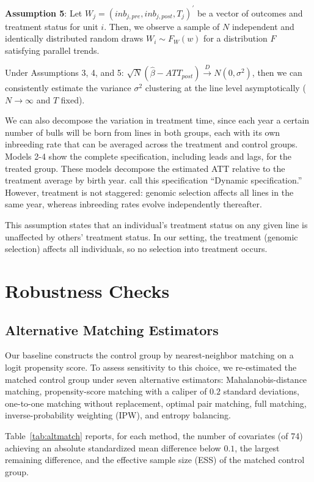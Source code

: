 \documentclass[12pt,letterpaper]{article}
\begin{document}
\medskip
\textbf{Assumption 5}: Let $W_{j}=(inb_{j,pre}, inb_{j,post}, T_{j})^{'}$ be a vector of outcomes and treatment status for unit $i$. Then, we observe a sample of $N$  independent and identically distributed random draws $W_{i}\sim F_{W}(w)$ for a distribution $F$ satisfying parallel trends.

Under Assumptions 3, 4, and 5: $\sqrt{N}(\hat{\beta}-ATT_{post})\overset{D}{\rightarrow} N(0, \sigma^{2})$, then we can consistently estimate the variance $\sigma^{2}$ clustering at the line level \citep{Bertrand2004} asymptotically ($N\rightarrow\infty$ and $T$ fixed).

We can also decompose the variation in treatment time, since each year a certain number of bulls will be born from lines in both groups, each with its own inbreeding rate that can be averaged across the treatment and control groups. Models 2-4 show the complete specification, including leads and lags, for the treated group. These models decompose the estimated ATT relative to the treatment average by birth year. \cite{Sun2021} call this specification ``Dynamic specification.'' However, treatment is not staggered: genomic selection affects all lines in the same year, whereas inbreeding rates evolve independently thereafter. 

This assumption states that an individual's treatment status on any given line is unaffected by others' treatment status. In our setting, the treatment (genomic selection) affects all individuals, so no selection into treatment occurs.

\section{Robustness Checks\label{subsec:robustness}}
\subsection{Alternative Matching Estimators}\label{subsec:altmatch}
 
Our baseline constructs the control group by nearest-neighbor matching on a logit propensity score. To assess sensitivity to this choice, we re-estimated the matched control group under seven alternative estimators: Mahalanobis-distance matching, propensity-score matching with a caliper of $0.2$ standard deviations, one-to-one matching without replacement, optimal pair matching, full matching, inverse-probability weighting (IPW), and entropy balancing. 

Table~\ref{tab:altmatch} reports, for each method, the number of covariates (of 74) achieving an absolute standardized mean difference below $0.1$, the largest remaining difference, and the effective sample size (ESS) of the matched control group.
 
\end{document}
